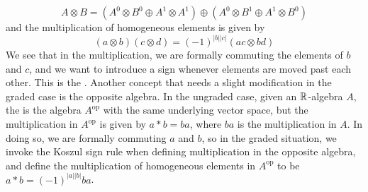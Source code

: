 \[
A \otimes B = (A^0 \otimes B^0 \oplus A^1 \otimes A^1) \oplus (A^0 \otimes B^1
\oplus A^1 \otimes B^0)
\]
and the multiplication of homogeneous elements is given by
\[
(a \otimes b)(c \otimes d) = (-1)^{|b||c|}(ac \otimes bd)
\]
We see that in the multiplication, we are formally commuting the elements of
$b$ and $c$, and we want to introduce a sign whenever elements are moved past
each other. This is the . Another concept that needs
a slight modification in the graded case is the opposite algebra. In the
ungraded case, given an $\mathbb{R}$-algebra $A$, the  is
the algebra $A^{\text{op}}$ with the same underlying vector space, but
the multiplication in $A^\text{op}$ is given by $a * b = ba$, where $ba$
is the multiplication in $A$. In doing so, we are formally commuting $a$
and $b$, so in the graded situation, we invoke the Koszul sign rule when
defining multiplication in the opposite algebra, and define the multiplication
of homogeneous elements in $A^{\text{op}}$ to be $a * b = (-1)^{|a||b|} ba$.\\


